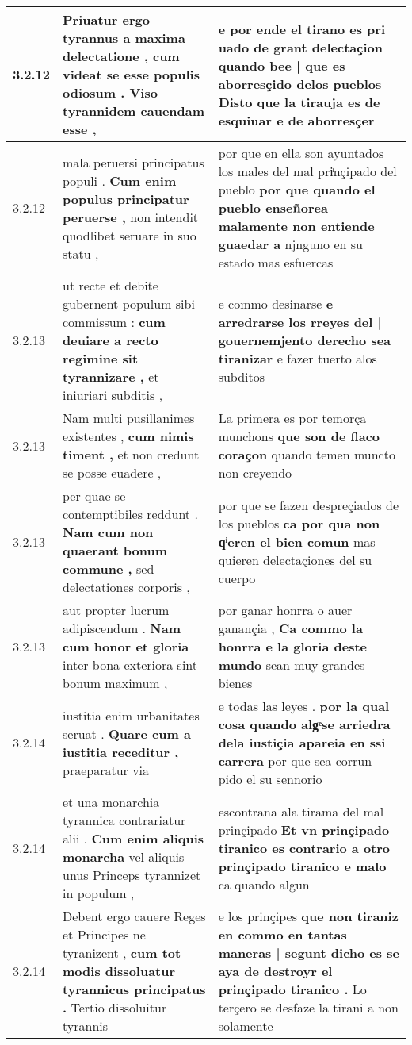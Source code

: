 \begin{tabular}{|p{1cm}|p{6.5cm}|p{6.5cm}|}
3.2.12 & Priuatur ergo tyrannus a maxima delectatione , \textbf{ cum videat se esse populis odiosum . } Viso tyrannidem cauendam esse , & e por ende el tirano es pri uado de grant delectaçion \textbf{ quando bee | que es aborresçido delos pueblos } Disto que la tirauja es de esquiuar e de aborresçer \\\hline
3.2.12 & mala peruersi principatus populi . \textbf{ Cum enim populus principatur peruerse , } non intendit quodlibet seruare in suo statu , & por que en ella son ayuntados los males del mal priͥnçipado del pueblo \textbf{ por que quando el pueblo enseñorea malamente non entiende guaedar a } njnguno en su estado mas esfuercas \\\hline
3.2.13 & ut recte et debite gubernent populum sibi commissum : \textbf{ cum deuiare a recto regimine sit tyrannizare , } et iniuriari subditis , & e commo desinarse \textbf{ e arredrarse los rreyes del | gouernemjento derecho sea tiranizar } e fazer tuerto alos subditos \\\hline
3.2.13 & Nam multi pusillanimes existentes , \textbf{ cum nimis timent , } et non credunt se posse euadere , & La primera es por temorça munchons \textbf{ que son de flaco coraçon } quando temen muncto non creyendo \\\hline
3.2.13 & per quae se contemptibiles reddunt . \textbf{ Nam cum non quaerant bonum commune , } sed delectationes corporis , & por que se fazen despreçiados de los pueblos \textbf{ ca por qua non qͥeren el bien comun } mas quieren delectaçiones del su cuerpo \\\hline
3.2.13 & aut propter lucrum adipiscendum . \textbf{ Nam cum honor et gloria } inter bona exteriora sint bonum maximum , & por ganar honrra o auer ganançia , \textbf{ Ca commo la honrra e la gloria deste mundo } sean muy grandes bienes \\\hline
3.2.14 & iustitia enim urbanitates seruat . \textbf{ Quare cum a iustitia receditur , } praeparatur via & e todas las leyes . \textbf{ por la qual cosa quando algͤse arriedra dela iustiçia apareia en ssi carrera } por que sea corrun pido el su sennorio \\\hline
3.2.14 & et una monarchia tyrannica contrariatur alii . \textbf{ Cum enim aliquis monarcha } vel aliquis unus Princeps tyrannizet in populum , & escontrana ala tirama del mal prinçipado \textbf{ Et vn prinçipado tiranico es contrario a otro prinçipado tiranico e malo } ca quando algun \\\hline
3.2.14 & Debent ergo cauere Reges et Principes ne tyranizent , \textbf{ cum tot modis dissoluatur tyrannicus principatus . } Tertio dissoluitur tyrannis & e los prinçipes \textbf{ que non tiraniz en commo en tantas maneras | segunt dicho es se aya de destroyr el prinçipado tiranico . } Lo terçero se desfaze la tirani a non solamente \\\hline

\end{tabular}

